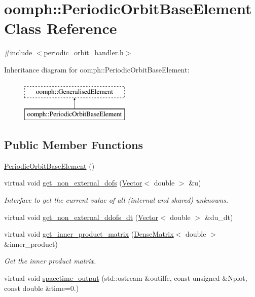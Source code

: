 \hypertarget{classoomph_1_1PeriodicOrbitBaseElement}{}\section{oomph\+:\+:Periodic\+Orbit\+Base\+Element Class Reference}
\label{classoomph_1_1PeriodicOrbitBaseElement}


{\ttfamily \#include $<$periodic\+\_\+orbit\+\_\+handler.\+h$>$}

Inheritance diagram for oomph\+:\+:Periodic\+Orbit\+Base\+Element\+:\begin{figure}[H]
\begin{center}
\leavevmode
\includegraphics[height=2.000000cm]{classoomph_1_1PeriodicOrbitBaseElement}
\end{center}
\end{figure}
\subsection*{Public Member Functions}
\begin{DoxyCompactItemize}
\item 
\hyperlink{classoomph_1_1PeriodicOrbitBaseElement_a1eb14a3e5456ff4f6dda6032ab26f9fe}{Periodic\+Orbit\+Base\+Element} ()
\item 
virtual void \hyperlink{classoomph_1_1PeriodicOrbitBaseElement_abba1af9fcade9cb3348ba3211b4241b6}{get\+\_\+non\+\_\+external\+\_\+dofs} (\hyperlink{classoomph_1_1Vector}{Vector}$<$ double $>$ \&u)
\begin{DoxyCompactList}\small\item\em Interface to get the current value of all (internal and shared) unknowns. \end{DoxyCompactList}\item 
virtual void \hyperlink{classoomph_1_1PeriodicOrbitBaseElement_a115fb7538cac83389818170a6b36bdcc}{get\+\_\+non\+\_\+external\+\_\+ddofs\+\_\+dt} (\hyperlink{classoomph_1_1Vector}{Vector}$<$ double $>$ \&du\+\_\+dt)
\item 
virtual void \hyperlink{classoomph_1_1PeriodicOrbitBaseElement_acc9cea11affa9cba587419c833ef6ea9}{get\+\_\+inner\+\_\+product\+\_\+matrix} (\hyperlink{classoomph_1_1DenseMatrix}{Dense\+Matrix}$<$ double $>$ \&inner\+\_\+product)
\begin{DoxyCompactList}\small\item\em Get the inner product matrix. \end{DoxyCompactList}\item 
virtual void \hyperlink{classoomph_1_1PeriodicOrbitBaseElement_a6d543d9fa979ed60cec6b5f0dac4b0d6}{spacetime\+\_\+output} (std\+::ostream \&outilfe, const unsigned \&Nplot, const double \&time=0.)
\end{DoxyCompactItemize}
